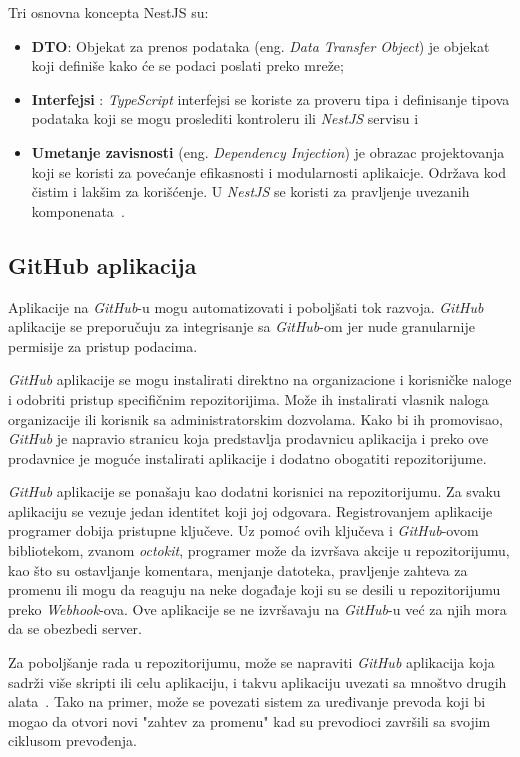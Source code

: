 Tri osnovna koncepta NestJS su:
\begin{itemize}
\item \textbf{DTO}: Objekat za prenos podataka (eng. \textit{Data Transfer Object}) je objekat 
koji definiše kako će se podaci poslati preko mreže;
\item \textbf{Interfejsi} : \textit{TypeScript} interfejsi se koriste za proveru tipa i 
definisanje tipova podataka koji se mogu proslediti kontroleru ili \textit{NestJS} servisu i
\item \textbf{Umetanje zavisnosti} (eng. \textit{Dependency Injection}) je obrazac projektovanja 
koji se koristi za povećanje efikasnosti i modularnosti aplikaicje. Održava kod čistim i 
lakšim za korišćenje. U \textit{NestJS} se koristi za pravljenje uvezanih komponenata~\cite{nest_getting_started}.
\end{itemize}

\subsection{GitHub aplikacija}\label{sec:github_app}
Aplikacije na \textit{GitHub}-u mogu automatizovati i poboljšati tok razvoja. \textit{GitHub} 
aplikacije se preporučuju za integrisanje sa \textit{GitHub}-om jer nude granularnije permisije 
za pristup podacima. 

\textit{GitHub} aplikacije se mogu instalirati direktno na organizacione i korisničke naloge i 
odobriti pristup specifičnim repozitorijima. Može ih instalirati vlasnik naloga organizacije 
ili korisnik sa administratorskim dozvolama. Kako bi ih promovisao, \textit{GitHub} je napravio
stranicu koja predstavlja prodavnicu aplikacija i preko ove prodavnice je moguće instalirati 
aplikacije i dodatno obogatiti repozitorijume.

\textit{GitHub} aplikacije se ponašaju kao dodatni korisnici na repozitorijumu. Za svaku 
aplikaciju se vezuje jedan identitet koji joj odgovara. Registrovanjem aplikacije programer 
dobija pristupne ključeve. Uz pomoć ovih ključeva i \textit{GitHub}-ovom bibliotekom, zvanom \textit{octokit},
programer može da izvršava akcije u repozitorijumu, kao što su ostavljanje komentara,
menjanje datoteka, pravljenje zahteva za promenu ili mogu da reaguju na neke događaje koji su se 
desili u repozitorijumu preko \textit{Webhook}-ova. Ove aplikacije se ne izvršavaju na 
\textit{GitHub}-u već za njih mora da se obezbedi server. 

Za poboljšanje rada u repozitorijumu, može se napraviti \textit{GitHub} aplikacija koja sadrži više skripti 
ili celu aplikaciju, i takvu aplikaciju uvezati sa mnoštvo drugih alata~\cite{github_apps}. Tako na 
primer, može se povezati sistem za uređivanje prevoda koji bi mogao da otvori novi "zahtev za promenu"
kad su prevodioci završili sa svojim ciklusom prevođenja.

